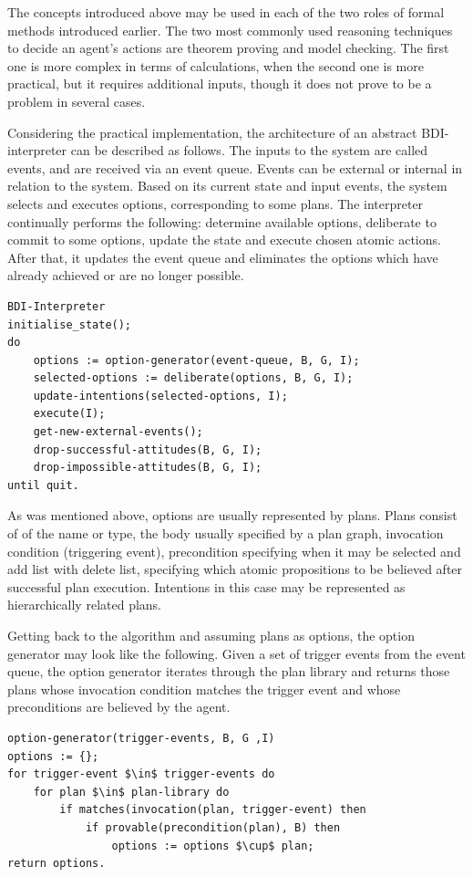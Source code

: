 The concepts introduced above may be used in each of the two roles of formal methods introduced earlier.
The two most commonly used reasoning techniques to decide an agent's actions are theorem proving and model checking.
The first one is more complex in terms of calculations, when the second one is more practical, but it requires additional inputs, though it does not prove to be a problem in several cases.

Considering the practical implementation, the architecture of an abstract BDI-interpreter can be described as follows.
The inputs to the system are called events, and are received via an event queue.
Events can be external or internal in relation to the system.
Based on its current state and input events, the system selects and executes options, corresponding to some plans.
The interpreter continually performs the following: determine available options, deliberate to commit to some options, update the state and execute chosen atomic actions.
After that, it updates the event queue and eliminates the options which have already achieved or are no longer possible.

\begin{lstlisting}
BDI-Interpreter
initialise_state();
do
    options := option-generator(event-queue, B, G, I);
    selected-options := deliberate(options, B, G, I);
    update-intentions(selected-options, I);
    execute(I);
    get-new-external-events();
    drop-successful-attitudes(B, G, I);
    drop-impossible-attitudes(B, G, I);
until quit.
\end{lstlisting}

As was mentioned above, options are usually represented by plans.
Plans consist of of the name or type, the body usually specified by a plan graph, invocation condition (triggering event), precondition specifying when it may be selected and add list with delete list, specifying which atomic propositions to be believed after successful plan execution.
Intentions in this case may be represented as hierarchically related plans.

Getting back to the algorithm and assuming plans as options, the option generator may look like the following.
Given a set of trigger events from the event queue, the option generator iterates through the plan library and returns those plans whose invocation condition matches the trigger event and whose preconditions are believed by the agent.

\begin{lstlisting}[mathescape]
option-generator(trigger-events, B, G ,I)
options := {};
for trigger-event $\in$ trigger-events do
    for plan $\in$ plan-library do
        if matches(invocation(plan, trigger-event) then
            if provable(precondition(plan), B) then
                options := options $\cup$ plan;
return options.
\end{lstlisting}

